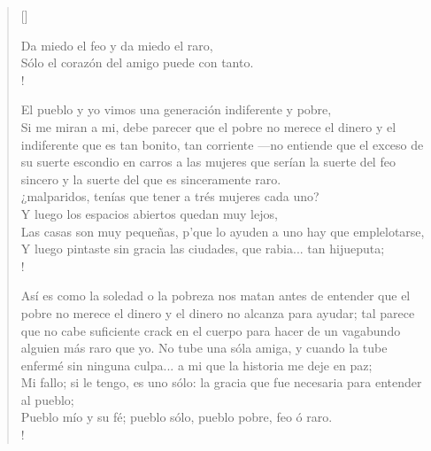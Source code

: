 \documentclass[11pt, a4paper]{article} %
\newcommand{\poemauthorright}[1]{\nopagebreak{\raggedleft\footnotesize\textsc{#1}\par}} %
\begin{document}
\begin{verse}[\versewidth]
{{%

Da miedo el feo y da miedo el raro, \\
Sólo el corazón del amigo puede con tanto. \\!


El pueblo y yo vimos una generación indiferente y pobre, \\
Si me miran a mi, debe parecer que el pobre no merece el dinero y el indiferente que es tan bonito, tan corriente 
---no entiende que el exceso de su suerte escondio en carros 
a las mujeres que serían la suerte del feo sincero y la suerte del que es sinceramente raro. \\
¿malparidos, tenías que tener a trés mujeres cada uno? \\
Y luego los espacios abiertos quedan muy lejos, \\
Las casas son muy pequeñas, p'que lo ayuden a uno hay que emplelotarse, \\
Y luego pintaste sin gracia las ciudades, que rabia... tan hijueputa; \\!



Así es como la soledad o la pobreza nos matan antes de entender que el pobre no merece el dinero y el dinero no alcanza para ayudar; 
tal parece que no cabe suficiente crack en el cuerpo para hacer de un vagabundo alguien más raro que yo. 
No tube una sóla amiga, y cuando la tube enfermé sin ninguna culpa... a mi que la historia me deje en paz; \\
Mi fallo; si le tengo, es uno sólo: la gracia que fue necesaria para entender al pueblo; \\
Pueblo mío y su fé; pueblo sólo, pueblo pobre, feo ó raro. \\!

}
}
\end{verse}


\poemauthorright{the human, WAAJACU} %

\end{document}
